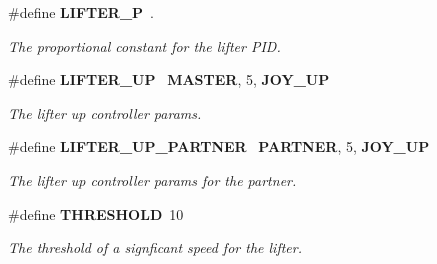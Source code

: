 \begin{DoxyCompactItemize}
\#define \textbf{ L\+I\+F\+T\+E\+R\+\_\+P}~.
\begin{DoxyCompactList}\small\item\em The proportional constant for the lifter P\+ID. \end{DoxyCompactList}\item 
\#define \textbf{ L\+I\+F\+T\+E\+R\+\_\+\+UP}~\textbf{ M\+A\+S\+T\+ER}, 5, \textbf{ J\+O\+Y\+\_\+\+UP}
\begin{DoxyCompactList}\small\item\em The lifter up controller params. \end{DoxyCompactList}\item 
\#define \textbf{ L\+I\+F\+T\+E\+R\+\_\+\+U\+P\+\_\+\+P\+A\+R\+T\+N\+ER}~\textbf{ P\+A\+R\+T\+N\+ER}, 5, \textbf{ J\+O\+Y\+\_\+\+UP}
\begin{DoxyCompactList}\small\item\em The lifter up controller params for the partner. \end{DoxyCompactList}\item 
\#define \textbf{ T\+H\+R\+E\+S\+H\+O\+LD}~10
\begin{DoxyCompactList}\small\item\em The threshold of a signficant speed for the lifter. \end{DoxyCompactList}\end{DoxyCompactItemize}
